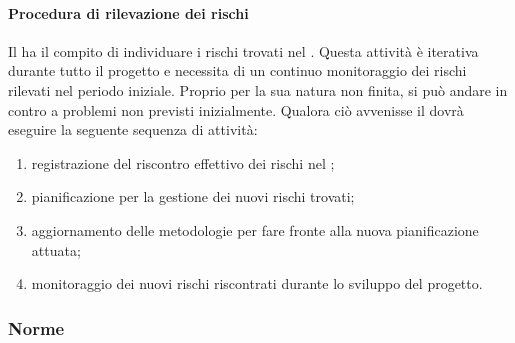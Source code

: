 			\paragraph{Procedura di rilevazione dei rischi}
			Il \roleProjectManager{} ha il compito di individuare i rischi trovati nel \docNameVersionPdP. \newline
			Questa attività è iterativa durante tutto il progetto e necessita di un continuo monitoraggio dei rischi rilevati nel periodo iniziale. Proprio per la sua natura non finita, si può andare in contro a problemi non previsti inizialmente. \newline
			Qualora ciò avvenisse il \roleProjectManager{} dovrà eseguire la seguente sequenza di attività:
				\begin{enumerate}
					\item registrazione del riscontro effettivo dei rischi nel \docNameVersionPdP;
					\item pianificazione per la gestione dei nuovi rischi trovati;
					\item aggiornamento delle metodologie per fare fronte alla nuova pianificazione attuata;
					\item monitoraggio dei nuovi rischi riscontrati durante lo sviluppo del progetto.
				\end{enumerate}
				
		\subsubsection{Norme}
